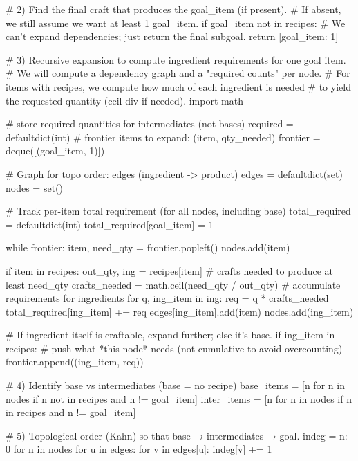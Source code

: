 \begin{ModelTurn}
{{    # 2) Find the final craft that produces the goal_item (if present).
    # If absent, we still assume we want at least 1 goal_item.
    if goal_item not in recipes:
        # We can't expand dependencies; just return the final subgoal.
        return [{goal_item: 1}]

    # 3) Recursive expansion to compute ingredient requirements for one goal item.
    # We will compute a dependency graph and a "required counts" per node.
    # For items with recipes, we compute how much of each ingredient is needed
    # to yield the requested quantity (ceil div if needed).
    import math

    # store required quantities for intermediates (not bases)
    required = defaultdict(int)
    # frontier items to expand: (item, qty_needed)
    frontier = deque([(goal_item, 1)])

    # Graph for topo order: edges (ingredient -> product)
    edges = defaultdict(set)
    nodes = set()

    # Track per-item total requirement (for all nodes, including base)
    total_required = defaultdict(int)
    total_required[goal_item] = 1

    while frontier:
        item, need_qty = frontier.popleft()
        nodes.add(item)

        if item in recipes:
            out_qty, ing = recipes[item]
            # crafts needed to produce at least need_qty
            crafts_needed = math.ceil(need_qty / out_qty)
            # accumulate requirements for ingredients
            for q, ing_item in ing:
                req = q * crafts_needed
                total_required[ing_item] += req
                edges[ing_item].add(item)
                nodes.add(ing_item)

                # If ingredient itself is craftable, expand further; else it's base.
                if ing_item in recipes:
                    # push what *this node* needs (not cumulative to avoid overcounting)
                    frontier.append((ing_item, req))

    # 4) Identify base vs intermediates (base = no recipe)
    base_items = [n for n in nodes if n not in recipes and n != goal_item]
    inter_items = [n for n in nodes if n in recipes and n != goal_item]

    # 5) Topological order (Kahn) so that base → intermediates → goal.
    indeg = {n: 0 for n in nodes}
    for u in edges:
        for v in edges[u]:
            indeg[v] += 1

}}
\end{ModelTurn}
